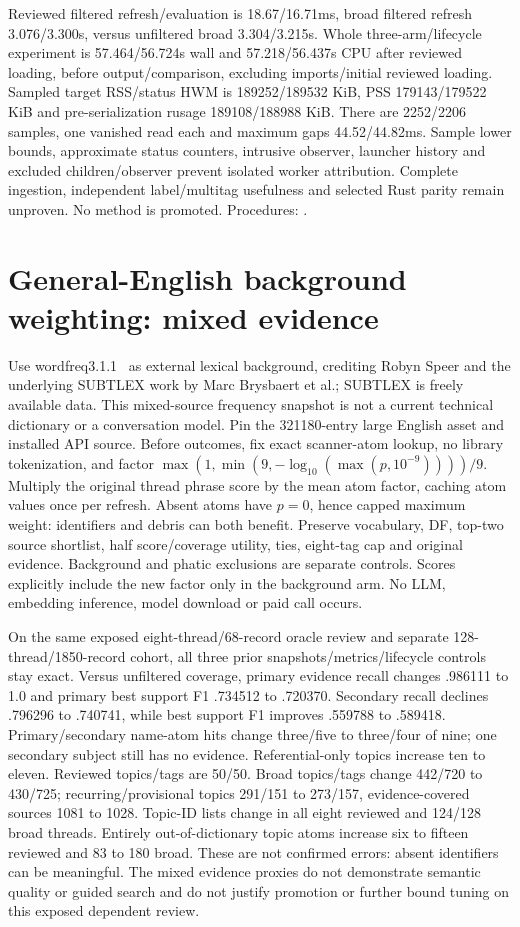 \documentclass[11pt]{article}
\begin{document}
Reviewed filtered refresh/evaluation is 18.67/16.71ms, broad filtered refresh
3.076/3.300s, versus unfiltered broad 3.304/3.215s. Whole three-arm/lifecycle
experiment is 57.464/56.724s wall and 57.218/56.437s CPU after reviewed loading,
before output/comparison, excluding imports/initial reviewed loading. Sampled
target RSS/status HWM is 189252/189532 KiB, PSS 179143/179522 KiB and
pre-serialization rusage 189108/188988 KiB. There are 2252/2206 samples,
one vanished read each and maximum gaps 44.52/44.82ms. Sample lower bounds,
approximate status counters, intrusive observer, launcher history and excluded
children/observer prevent isolated worker attribution. Complete ingestion,
independent label/multitag usefulness and selected Rust parity remain unproven.
No method is promoted. Procedures: .

\section{General-English background weighting: mixed evidence}
Use wordfreq3.1.1~\cite{wordfreq} as external lexical background, crediting
Robyn Speer and the underlying SUBTLEX work by Marc Brysbaert et al.; SUBTLEX
is freely available data. This mixed-source frequency snapshot is not a current
technical dictionary or a conversation model. Pin the 321180-entry large English
asset and installed API source. Before outcomes, fix exact scanner-atom lookup,
no library tokenization, and factor
$\max(1,\min(9,-\log_{10}(\max(p,10^{-9}))))/9$.
Multiply the original thread phrase score by the mean atom factor, caching
atom values once per refresh. Absent atoms have $p=0$, hence capped maximum
weight: identifiers and debris can both benefit. Preserve vocabulary, DF,
top-two source shortlist, half score/coverage utility, ties, eight-tag cap and
original evidence. Background and phatic exclusions are separate controls.
Scores explicitly include the new factor only in the background arm.
No LLM, embedding inference, model download or paid call occurs.

On the same exposed eight-thread/68-record oracle review and separate
128-thread/1850-record cohort, all three prior snapshots/metrics/lifecycle
controls stay exact. Versus unfiltered coverage, primary evidence recall changes
.986111 to 1.0 and primary best support F1 .734512 to .720370. Secondary
recall declines .796296 to .740741, while best support F1 improves .559788 to
.589418. Primary/secondary name-atom hits change three/five to three/four of
nine; one secondary subject still has no evidence. Referential-only topics
increase ten to eleven. Reviewed topics/tags are 50/50. Broad topics/tags
change 442/720 to 430/725; recurring/provisional topics 291/151 to 273/157,
evidence-covered sources 1081 to 1028. Topic-ID lists change in all eight
reviewed and 124/128 broad threads. Entirely out-of-dictionary topic atoms
increase six to fifteen reviewed and 83 to 180 broad. These are not confirmed
errors: absent identifiers can be meaningful. The mixed evidence proxies do
not demonstrate semantic quality or guided search and do not justify promotion
or further bound tuning on this exposed dependent review.
\end{document}
